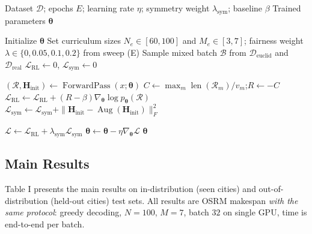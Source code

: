 \documentclass[journal,twoside,web]{ieeecolor}
\theoremstyle{definition}
\theoremstyle{remark}
\theoremstyle{definition}
\begin{document}
\begin{algorithm}[htbp]
\caption{Hybrid NCO Training}
\label{alg:train}
\begin{algorithmic}[1]
\Require Dataset $\mathcal{D}$; epochs $E$; learning rate $\eta$;
symmetry weight $\lambda_{\mathrm{sym}}$; baseline $\beta$
\Ensure Trained parameters $\boldsymbol{\theta}$

\State Initialize $\boldsymbol{\theta}$
    \State Set curriculum sizes $N_e\in[60,100]$ and $M_e\in[3,7]$; fairness weight $\lambda\in\{0,0.05,0.1,0.2\}$ from sweep (E)
    \State Sample mixed batch $\mathcal{B}$ from
    $\mathcal{D}_{\mathrm{euclid}}$ and $\mathcal{D}_{\mathrm{real}}$
    \State $\mathcal{L}_{\mathrm{RL}}\gets0$,
    $\mathcal{L}_{\mathrm{sym}}\gets0$

        \State $(\mathcal{R},\mathbf{H}_{\mathrm{init}})
        \gets\operatorname{ForwardPass}(x;\boldsymbol{\theta})$
        \State $C\gets\max_m
        \operatorname{len}(\mathcal{R}_m)/v_m$;\quad $R\gets-C$
        \State $\mathcal{L}_{\mathrm{RL}}\gets
        \mathcal{L}_{\mathrm{RL}}+
        (R-\beta)\nabla_{\boldsymbol{\theta}}
        \log p_{\boldsymbol{\theta}}(\mathcal{R})$
        \State $\mathcal{L}_{\mathrm{sym}}\gets
        \mathcal{L}_{\mathrm{sym}}+
        \|\mathbf{H}_{\mathrm{init}}-
        \operatorname{Aug}(\mathbf{H}_{\mathrm{init}})\|_F^2$
    \EndFor

    \State $\mathcal{L}\gets
    \mathcal{L}_{\mathrm{RL}}+
    \lambda_{\mathrm{sym}}\mathcal{L}_{\mathrm{sym}}$
    \State $\boldsymbol{\theta}\gets
    \boldsymbol{\theta}-\eta\nabla_{\boldsymbol{\theta}}\mathcal{L}$
\EndFor
\State \Return $\boldsymbol{\theta}$
\end{algorithmic}
\end{algorithm}

\subsection{Main Results}

Table I presents the main results on in-distribution (seen cities) and out-of-distribution (held-out cities) test sets. All results are OSRM makespan \emph{with the same protocol}: greedy decoding, $N{=}100$, $M{=}7$, batch $32$ on single GPU, time is end-to-end per batch.
\end{document}
